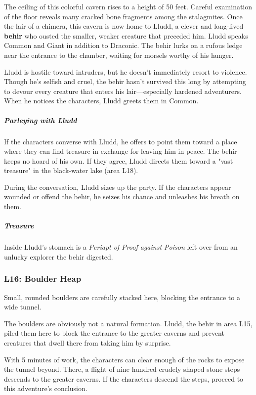 \documentclass[10pt,a4paper,twoside,bg=print,twocolumn,openany,nodeprecatedcode]{dndbook}
\begin{document}
The ceiling of this colorful cavern rises to a height of 50 feet. Careful examination of the floor reveals many cracked bone fragments among the stalagmites. Once the lair of a chimera, this cavern is now home to Lludd, a clever and long-lived \textbf{behir} who ousted the smaller, weaker creature that preceded him. Lludd speaks Common and Giant in addition to Draconic. The behir lurks on a rufous ledge near the entrance to the chamber, waiting for morsels worthy of his hunger.

Lludd is hostile toward intruders, but he doesn't immediately resort to violence. Though he's selfish and cruel, the behir hasn't survived this long by attempting to devour every creature that enters his lair—especially hardened adventurers. When he notices the characters, Lludd greets them in Common.

\subparagraph{Parleying with Lludd}
If the characters converse with Lludd, he offers to point them toward a place where they can find treasure in exchange for leaving him in peace. The behir keeps no hoard of his own. If they agree, Lludd directs them toward a "vast treasure" in the black-water lake (area L18).

During the conversation, Lludd sizes up the party. If the characters appear wounded or offend the behir, he seizes his chance and unleashes his breath on them.

\subparagraph{Treasure}
Inside Lludd's stomach is a \textit{Periapt of Proof against Poison} left over from an unlucky explorer the behir digested.

\subsubsection{L16: Boulder Heap}
\begin{DndReadAloud}{}
Small, rounded boulders are carefully stacked here, blocking the entrance to a wide tunnel.

\end{DndReadAloud}

The boulders are obviously not a natural formation. Lludd, the behir in area L15, piled them here to block the entrance to the greater caverns and prevent creatures that dwell there from taking him by surprise.

With 5 minutes of work, the characters can clear enough of the rocks to expose the tunnel beyond. There, a flight of nine hundred crudely shaped stone steps descends to the greater caverns. If the characters descend the steps, proceed to this adventure's conclusion.
\end{document}
